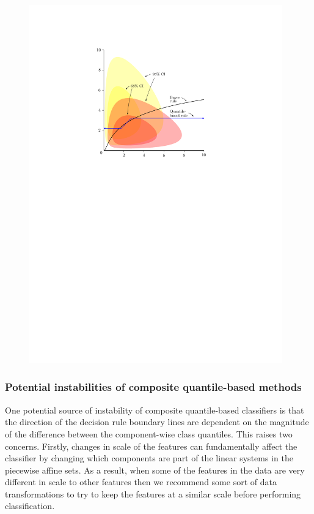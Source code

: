 \begin{figure}[ht]
\begin{minipage}[t]{0.49\linewidth}
    \includegraphics[width=0.975\textwidth]{gamma_cqc}
  \end{minipage}
\end{figure}




\subsubsection{Potential instabilities of composite quantile-based methods}
\label{sec:instabilities}

One potential source of instability of composite quantile-based classifiers is
that the direction of the decision rule boundary lines are dependent on the
magnitude of the difference between the component-wise class quantiles.  This
raises two concerns.  Firstly, changes in scale of the features can
fundamentally affect the classifier by changing which components are part of the
linear systems in the piecewise affine sets.  As a result, when some of the
features in the data are very different in scale to other features then we
recommend some sort of data transformations to try to keep the features at a
similar scale before performing classification.

